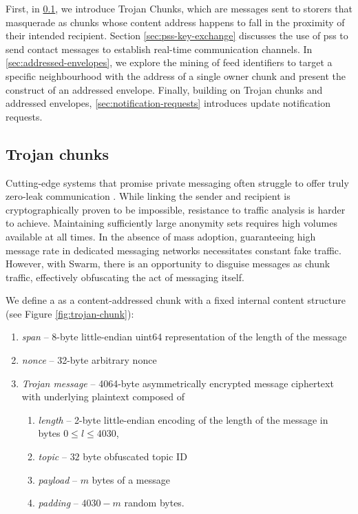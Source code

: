 First, in \ref{sec:trojan}, we introduce Trojan Chunks, which are messages sent to storers that masquerade as chunks whose content address happens to fall in the proximity of their intended recipient. 
Section \ref{sec:pss-key-exchange} discusses the use of pss to send contact messages to establish real-time communication channels.
In \ref{sec:addressed-envelopes}, we explore the mining of feed identifiers to target a specific neighbourhood with the address of a single owner chunk and present the construct of an addressed envelope. Finally, building on Trojan chunks and addressed envelopes, \ref{sec:notification-requests} introduces update notification requests.

\subsection{Trojan chunks\statusgreen}\label{sec:trojan}

Cutting-edge systems that promise private messaging often struggle to offer truly zero-leak communication \cite{kwon2016riffle}. While linking the sender and recipient is cryptographically proven to be impossible, resistance to traffic analysis is harder to achieve. Maintaining sufficiently large anonymity sets requires high volumes available at all times. In the absence of mass adoption, guaranteeing high message rate in dedicated messaging networks necessitates constant fake traffic. However, with Swarm, there is an opportunity to disguise messages as chunk traffic, effectively obfuscating the act of messaging itself. 

We define a  as a content-addressed chunk with a fixed internal content structure (see Figure \ref{fig:trojan-chunk}):

\begin{enumerate}
    \item \emph{span} -- 8-byte little-endian uint64 representation of the length of the message  
    \item \emph{nonce} -- 32-byte arbitrary nonce 
    \item \emph{Trojan message} -- 4064-byte asymmetrically encrypted message ciphertext with underlying plaintext composed of
    \begin{enumerate}
        \item \emph{length} -- 2-byte little-endian encoding of the length of the message in bytes $0\leq l\leq 4030$,
        \item \emph{topic} -- $32$ byte obfuscated topic ID   
        \item \emph{payload} -- $m$ bytes of a message 
        \item \emph{padding} -- $4030-m$ random bytes.
    \end{enumerate}
\end{enumerate}

